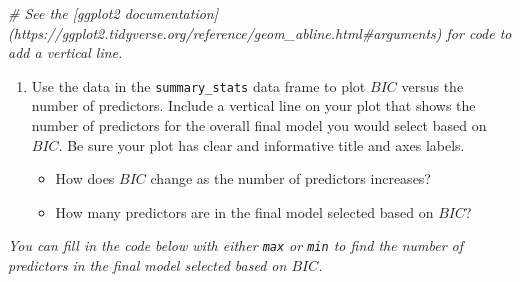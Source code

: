 \documentclass[]{book}
\newenvironment{Shaded}{\begin{snugshade}}{\end{snugshade}}
\newcommand{\KeywordTok}[1]{\textcolor[rgb]{0.13,0.29,0.53}{\textbf{#1}}}
\newcommand{\StringTok}[1]{\textcolor[rgb]{0.31,0.60,0.02}{#1}}
\newcommand{\CommentTok}[1]{\textcolor[rgb]{0.56,0.35,0.01}{\textit{#1}}}
\newcommand{\OperatorTok}[1]{\textcolor[rgb]{0.81,0.36,0.00}{\textbf{#1}}}
\newcommand{\NormalTok}[1]{#1}
\providecommand{\tightlist}{%
  \setlength{\itemsep}{0pt}\setlength{\parskip}{0pt}}
\begin{document}
\begin{Shaded}
\begin{Highlighting}[]
\CommentTok{# See the [ggplot2 documentation](https://ggplot2.tidyverse.org/reference/geom_abline.html#arguments) for code to add a vertical line.}
\end{Highlighting}
\end{Shaded}

\begin{enumerate}
\def\labelenumi{\arabic{enumi}.}
\setcounter{enumi}{10}
\tightlist
\item
  Use the data in the \texttt{summary\_stats} data frame to plot \(BIC\)
  versus the number of predictors. Include a vertical line on your plot
  that shows the number of predictors for the overall final model you
  would select based on \(BIC\). Be sure your plot has clear and
  informative title and axes labels.

  \begin{itemize}
  \tightlist
  \item
    How does \(BIC\) change as the number of predictors increases?
  \item
    How many predictors are in the final model selected based on
    \(BIC\)?
  \end{itemize}
\end{enumerate}

\emph{You can fill in the code below with either \texttt{max} or
\texttt{min} to find the number of predictors in the final model
selected based on \(BIC\).}

\begin{Shaded}
\end{Shaded}
\end{document}

